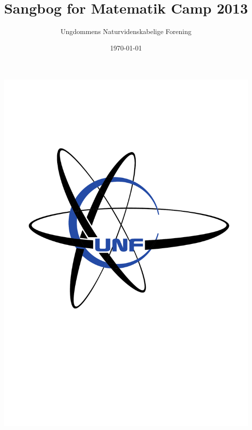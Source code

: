 



\title{Sangbog for Matematik Camp 2013}
\author{Ungdommens Naturvidenskabelige Forening}
\date{\today}




\thispagestyle{empty}

\centering

\phantom{test}
\vspace{1cm}


\mbox{\includegraphics[clip,trim=1cm 10cm 1cm 5cm,scale=.7]{Unflogo.pdf}}

